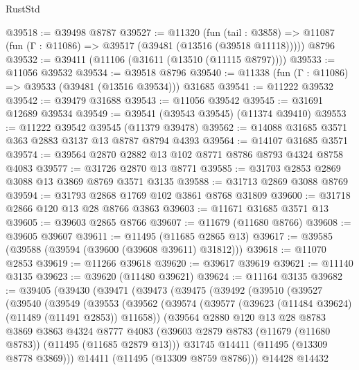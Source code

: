 \begin{lexlean}{RustStd}
\begin{coremodule}
@39518 := @39498 @8787
@39527 := @11320
    (fun (tail : @3858) => @11087 (fun (Γ : @11086) => @39517 (@39481 (@13516 (@39518 @11118)))))
    @8796
@39532 := @39411 (@11106 (@31611 (@13510 (@11115 @8797))))
@39533 := @11056 @39532
@39534 := @39518 @8796
@39540 := @11338 (fun (Γ : @11086) => @39533 (@39481 (@13516 @39534))) @31685
@39541 := @11222 @39532
@39542 := @39479 @31688
@39543 := @11056 @39542
@39545 := @31691 @12689 @39534
@39549 := @39541 (@39543 @39545) (@11374 @39410)
@39553 := @11222 @39542 @39545 (@11379 @39478)
@39562 := @14088 @31685 @3571 @363 @2883 @3137 @13 @8787 @8794 @4393
@39564 := @14107 @31685 @3571
@39574 := @39564 @2870 @2882 @13 @102 @8771 @8786 @8793 @4324 @8758 @4083
@39577 := @31726 @2870 @13 @8771
@39585 := @31703 @2853 @2869 @3088 @13 @3869 @8769 @3571 @3135
@39588 := @31713 @2869 @3088 @8769
@39594 := @31793 @2868 @1769 @102 @3861 @8768 @31809
@39600 := @31718 @2866 @120 @13 @28 @8766 @3863
@39603 := @11671 @31685 @3571 @13
@39605 := @39603 @2865 @8766
@39607 := @11679 (@11680 @8766)
@39608 := @39605 @39607
@39611 := @11495 (@11685 @2865 @13)
@39617 := @39585 (@39588 (@39594 (@39600 (@39608 @39611) @31812)))
@39618 := @11070 @2853
@39619 := @11266 @39618
@39620 := @39617 @39619
@39621 := @11140 @3135
@39623 := @39620 (@11480 @39621)
@39624 := @11164 @3135
@39682 := @39405
    (@39430
      (@39471
        (@39473
          (@39475
            (@39492
              (@39510
                (@39527
                  (@39540
                    (@39549
                      (@39553
                        (@39562
                          (@39574
                            (@39577 (@39623 (@11484 @39624) (@11489 (@11491 @2853)) @11658))
                            (@39564
                              @2880
                              @120
                              @13
                              @28
                              @8783
                              @3869
                              @3863
                              @4324
                              @8777
                              @4083
                              (@39603
                                @2879
                                @8783
                                (@11679 (@11680 @8783))
                                (@11495 (@11685 @2879 @13)))
                              @31745
                              @14411
                              (@11495 (@13309 @8778 @3869)))
                            @14411
                            (@11495 (@13309 @8759 @8786)))
                          @14428
                          @14432

\end{coremodule}
\end{lexlean}

